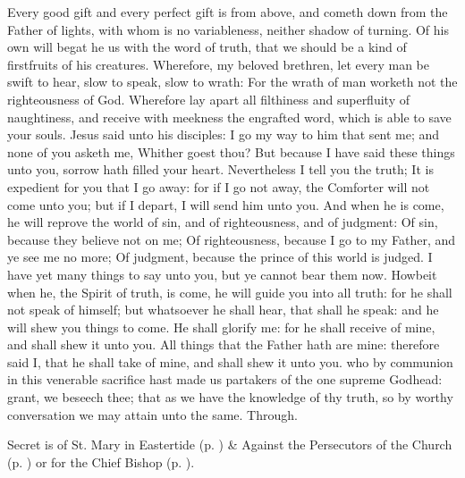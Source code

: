  Every good gift and every perfect gift is from above, and cometh down from the Father of lights, with whom is no variableness, neither shadow of turning. Of his own will begat he us with the word of truth, that we should be a kind of firstfruits of his creatures. Wherefore, my beloved brethren, let every man be swift to hear, slow to speak, slow to wrath: For the wrath of man worketh not the righteousness of God. Wherefore lay apart all filthiness and superfluity of naughtiness, and receive with meekness the engrafted word, which is able to save your souls.
 Jesus said unto his disciples: I go my way to him that sent me; and none of you asketh me, Whither goest thou? But because I have said these things unto you, sorrow hath filled your heart. Nevertheless I tell you the truth; It is expedient for you that I go away: for if I go not away, the Comforter will not come unto you; but if I depart, I will send him unto you. And when he is come, he will reprove the world of sin, and of righteousness, and of judgment: Of sin, because they believe not on me; Of righteousness, because I go to my Father, and ye see me no more; Of judgment, because the prince of this world is judged. I have yet many things to say unto you, but ye cannot bear them now. Howbeit when he, the Spirit of truth, is come, he will guide you into all truth: for he shall not speak of himself; but whatsoever he shall hear, that shall he speak: and he will shew you things to come. He shall glorify me: for he shall receive of mine, and shall shew it unto you. All things that the Father hath are mine: therefore said I, that he shall take of mine, and shall shew it unto you.
\secret
{} who by communion in this venerable sacrifice hast made us partakers of the one supreme Godhead: grant, we beseech thee; that as we have the knowledge of thy truth, so by worthy conversation we may attain unto the same. Through.
\begin{rubric}
     Secret is of St. Mary in Eastertide (p. \pageref{SPMaryInEaster}) \&  Against the Persecutors of the Church (p. \pageref{SPAgainst}) or for the Chief Bishop (p. \pageref{SPChiefBishop}).
\end{rubric}
